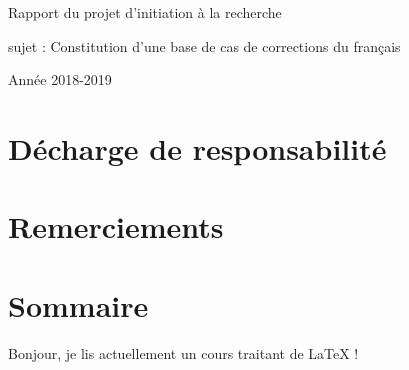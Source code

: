 \documentclass{article}
\begin{document}
\vspace*{100mm}
\begin{center}
	{\Huge Rapport du projet d'initiation \`{a} la recherche}
\end{center}
\begin{center}
sujet : Constitution d’une base de cas de corrections du fran\c{c}ais
\end{center}
\begin{center}
Ann\'ee 2018-2019
\end{center}
\cleardoublepage



\section{D\'echarge de responsabilit\'e}

\section{Remerciements}

\section{Sommaire}

Bonjour, je lis actuellement un cours traitant de LaTeX !
\end{document}
